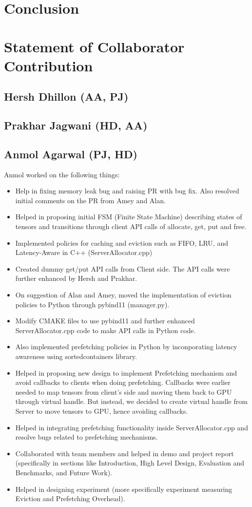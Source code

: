 \documentclass{article}
\begin{document}
\section{Conclusion}

\section{Statement of Collaborator Contribution}
\subsection{Hersh Dhillon (AA, PJ)}
\subsection{Prakhar Jagwani (HD, AA)}
\subsection{Anmol Agarwal (PJ, HD)}
Anmol worked on the following things:
\begin{itemize}
	\item Help in fixing memory leak bug and raising PR with bug fix. Also resolved initial comments on the PR from Amey and Alan.
	\item Helped in proposing initial FSM (Finite State Machine) describing states of tensors and transitions through client API calls
	of allocate, get, put and free.
	\item Implemented policies for caching and eviction such as FIFO, LRU, and Latency-Aware in C++ (ServerAllocator.cpp)
	\item Created dummy get/put API calls from Client side. The API calls were further enhanced by Hersh and Prakhar.
	\item On suggestion of Alan and Amey, moved the implementation of eviction policies to Python through pybind11 (manager.py).
	\item Modify CMAKE files to use pybind11 and further enhanced ServerAllocator.cpp code to make API calls in Python code.
	\item Also implemented prefetching policies in Python by inconporating latency awareness using sortedcontainers library.
	\item Helped in proposing new design to implement Prefetching mechanism and avoid callbacks to clients when doing prefetching.
	Callbacks were earlier needed to map tensors from client's side and moving them back to GPU through virtual handle. But instead,
	we decided to create virtual handle from Server to move tensors to GPU, hence avoiding callbacks.
	\item Helped in integrating prefetching functionality inside ServerAllocator.cpp and resolve bugs related to prefetching mechanisms.
	\item Collaborated with team members and helped in demo and project report (specifically in sections like Introduction, High Level Design,
	Evaluation and Benchmarks, and Future Work).
	\item Helped in designing experiment (more specifically experiment measuring Eviction and Prefetching Overhead).
\end{itemize}
\end{document}
